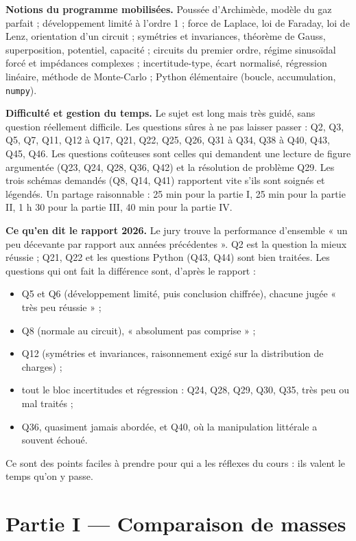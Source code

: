\documentclass[11pt,a4paper]{article}
\providecommand{\tightlist}{\setlength{\itemsep}{0pt}\setlength{\parskip}{0pt}}
\begin{document}
\textbf{Notions du programme mobilisées.} Poussée d'Archimède, modèle du gaz parfait ; développement limité à l'ordre 1 ; force de Laplace, loi de Faraday, loi de Lenz, orientation d'un circuit ; symétries et invariances, théorème de Gauss, superposition, potentiel, capacité ; circuits du premier ordre, régime sinusoïdal forcé et impédances complexes ; incertitude-type, écart normalisé, régression linéaire, méthode de Monte-Carlo ; Python élémentaire (boucle, accumulation, \texttt{numpy}).

\textbf{Difficulté et gestion du temps.} Le sujet est long mais très guidé, sans question réellement difficile. Les questions sûres à ne pas laisser passer : Q2, Q3, Q5, Q7, Q11, Q12 à Q17, Q21, Q22, Q25, Q26, Q31 à Q34, Q38 à Q40, Q43, Q45, Q46. Les questions coûteuses sont celles qui demandent une lecture de figure argumentée (Q23, Q24, Q28, Q36, Q42) et la résolution de problème Q29. Les trois schémas demandés (Q8, Q14, Q41) rapportent vite s'ils sont soignés et légendés. Un partage raisonnable : 25 min pour la partie I, 25 min pour la partie II, 1 h 30 pour la partie III, 40 min pour la partie IV.

\textbf{Ce qu'en dit le rapport 2026.} Le jury trouve la performance d'ensemble « un peu décevante par rapport aux années précédentes ». Q2 est la question la mieux réussie ; Q21, Q22 et les questions Python (Q43, Q44) sont bien traitées. Les questions qui ont fait la différence sont, d'après le rapport :

\begin{itemize}
\tightlist
\item
  Q5 et Q6 (développement limité, puis conclusion chiffrée), chacune jugée « très peu réussie » ;
\item
  Q8 (normale au circuit), « absolument pas comprise » ;
\item
  Q12 (symétries et invariances, raisonnement exigé sur la distribution de charges) ;
\item
  tout le bloc incertitudes et régression : Q24, Q28, Q29, Q30, Q35, très peu ou mal traités ;
\item
  Q36, quasiment jamais abordée, et Q40, où la manipulation littérale a souvent échoué.
\end{itemize}

Ce sont des points faciles à prendre pour qui a les réflexes du cours : ils valent le temps qu'on y passe.

\hypertarget{partie-i-comparaison-de-masses}{%
\section{Partie I --- Comparaison de masses}\label{partie-i-comparaison-de-masses}}
\end{document}
